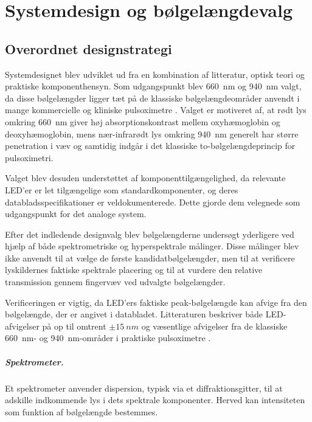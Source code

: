 \chapter{Systemdesign og bølgelængdevalg}
\label{chap:system_design}

\section{Overordnet designstrategi}

Systemdesignet blev udviklet ud fra en kombination af litteratur, optisk teori og praktiske komponenthensyn. Som udgangspunkt blev \SI{660}{nm} og \SI{940}{nm} valgt, da disse bølgelængder ligger tæt på de klassiske bølgelængdeområder anvendt i mange kommercielle og kliniske pulsoximetre \cite[s.~35]{Webster1997}. Valget er motiveret af, at rødt lys omkring \SI{660}{nm} giver høj absorptionskontrast mellem oxyhæmoglobin og deoxyhæmoglobin, mens nær-infrarødt lys omkring \SI{940}{nm} generelt har større penetration i væv og samtidig indgår i det klassiske to-bølgelængdeprincip for pulsoximetri.

Valget blev desuden understøttet af komponenttilgængelighed, da relevante LED'er er let tilgængelige som standardkomponenter, og deres databladsspecifikationer er veldokumenterede. Dette gjorde dem velegnede som udgangspunkt for det analoge system.

Efter det indledende designvalg blev bølgelængderne undersøgt yderligere ved hjælp af både spektrometriske og hyperspektrale målinger. Disse målinger blev ikke anvendt til at vælge de første kandidatbølgelængder, men til at verificere lyskildernes faktiske spektrale placering og til at vurdere den relative transmission gennem fingervæv ved udvalgte bølgelængder.

Verificeringen er vigtig, da LED'ers faktiske peak-bølgelængde kan afvige fra den bølgelængde, der er angivet i databladet. Litteraturen beskriver både LED-afvigelser på op til omtrent $\pm\SI{15}{nm}$ og væsentlige afvigelser fra de klassiske \SI{660}{nm}- og \SI{940}{nm}-områder i praktiske pulsoximetre \cite[s.~35]{Webster1997} \cite{Ruberry2025}.

\paragraph{Spektrometer.}
Et spektrometer anvender dispersion, typisk via et diffraktionsgitter, til at adskille indkommende lys i dets spektrale komponenter. Herved kan intensiteten som funktion af bølgelængde bestemmes.

